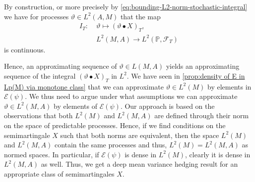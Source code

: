 \documentclass[11pt,a4paper,twoside,openany]{report}
\theoremstyle{plain} %
\theoremstyle{definition} %
\theoremstyle{remark} %
\begin{document}
\bigbreak
 By construction, or more precisely by \cref{eq:bounding-L2-norm-stochastic-integral} we have for processes \(\vartheta\in L^2(A,M)\) that the map
 \begin{align*}\label{eq:final integral map}
    I_{T}:\;&\vartheta\mapsto (\vartheta\bullet X)_{T},
     \\&L^2(M,A)\to L^2(\mathbb{P},\mathcal{F}_{T})
 \end{align*} is continuous.

 Hence, an approximating sequence of \(\vartheta\in L(M,A)\) yields an approximating sequence of the integral \((\vartheta\bullet X)_{T}\) in \(L^2\). We have seen in \cref{prop:density of E in Lp(M) via monotone class} that we can approximate \(\vartheta\in L^2(M)\) by elements in \(\mathcal{E}(\psi)\). We thus need to argue under what assumptions we can approximate \(\vartheta\in L^2(M,A)\) by elements of \(\mathcal{E}(\psi)\). Our approach is based on the observations that both \(L^2(M)\) and  \(L^2(M,A)\) are defined through their norm on the space of predictable processes. Hence, if we find conditions on the semimartingale \(X\) such that both norms are equivalent, then the space \(L^2(M)\) and \(L^2(M,A)\) contain the same processes and thus, \(L^2(M)=L^2(M,A)\) as normed spaces. In particular, if \(\mathcal{E}(\psi)\) is dense in \(L^2(M)\), clearly it is dense in \(L^2(M,A)\) as well. Thus, we get a deep mean variance hedging result for an appropriate class of semimartingales \(X\). 
\end{document}
